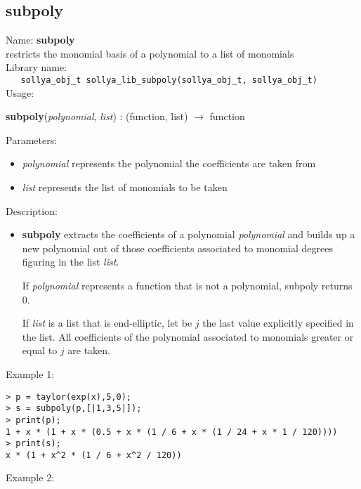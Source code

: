 \subsection{subpoly}
\label{labsubpoly}
\noindent Name: \textbf{subpoly}\\
\phantom{aaa}restricts the monomial basis of a polynomial to a list of monomials\\[0.2cm]
\noindent Library name:\\
\verb|   sollya_obj_t sollya_lib_subpoly(sollya_obj_t, sollya_obj_t)|\\[0.2cm]
\noindent Usage: 
\begin{center}
\textbf{subpoly}(\emph{polynomial}, \emph{list}) : (\textsf{function}, \textsf{list}) $\rightarrow$ \textsf{function}\\
\end{center}
Parameters: 
\begin{itemize}
\item \emph{polynomial} represents the polynomial the coefficients are taken from
\item \emph{list} represents the list of monomials to be taken
\end{itemize}
\noindent Description: \begin{itemize}

\item \textbf{subpoly} extracts the coefficients of a polynomial \emph{polynomial} and builds up a
   new polynomial out of those coefficients associated to monomial degrees figuring in
   the list \emph{list}. 
    
   If \emph{polynomial} represents a function that is not a polynomial, subpoly returns 0.
    
   If \emph{list} is a list that is end-elliptic, let be $j$ the last value explicitly specified
   in the list. All coefficients of the polynomial associated to monomials greater or
   equal to $j$ are taken.
\end{itemize}
\noindent Example 1: 
\begin{center}\begin{minipage}{15cm}\begin{Verbatim}[frame=single]
> p = taylor(exp(x),5,0);
> s = subpoly(p,[|1,3,5|]);
> print(p);
1 + x * (1 + x * (0.5 + x * (1 / 6 + x * (1 / 24 + x * 1 / 120))))
> print(s);
x * (1 + x^2 * (1 / 6 + x^2 / 120))
\end{Verbatim}
\end{minipage}\end{center}
\noindent Example 2: 

